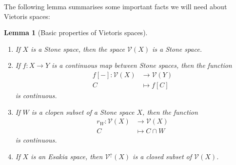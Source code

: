 \documentclass[12pt]{amsart}
\theoremstyle{plain}
\newtheorem{lemma}[theorem]{Lemma}
\theoremstyle{definition}
\newcommand{\V}{\mathcal{V}}
\newcommand{\Vu}{\V^{\uparrow}}
\begin{document}
The following lemma summarises some important facts we will need about Vietoris spaces:

\begin{lemma}[Basic properties of Vietoris spaces] \label{lem: basic facts about vietoris}
    \hfill
    \begin{enumerate}
        \item \label{eq: vietoris esakia} 
        If $X$ is a Stone space, then the space $\V(X)$ is a Stone space.
        \item \label{eq: continuous maps lift to Vietoris} If $f \colon X\to Y$ is a continuous map between Stone spaces, then the function
        \begin{align*}
            f[-] \colon \V(X)& \longrightarrow \V(Y)\\
            C & \longmapsto f[C]
        \end{align*}
        is continuous.
        \item \label{eq: restriction maps are continuous} If $W$ is a clopen subset of a Stone space $X$, then the function
        \begin{align*}
            r_{W}\colon \V(X) & \longrightarrow \V(X)\\
            C& \longmapsto C\cap W
        \end{align*}
        is continuous.
        
        \item \label{eq: ordered vietoris esakia} If $X$ is an Esakia space, then $\Vu(X)$ is a closed subset of $\V(X)$.
    \end{enumerate}
\end{lemma}
\end{document}
